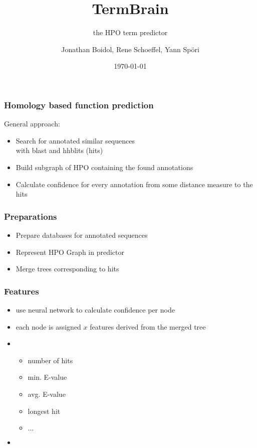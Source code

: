 \documentclass{beamer}
\author{Jonathan Boidol, Rene Schoeffel, Yann Sp\"ori}
\title{TermBrain}
\subtitle{the HPO term predictor}
\date{\today}
\begin{document}
\begin{frame}
\maketitle
 
\end{frame}

\begin{frame}
  \frametitle{Homology based function prediction}
  General approach:
  \begin{itemize}
  	\item Search for annotated similar sequences\\with blast and hhblits (hits)
  	\item Build subgraph of HPO containing the found annotations
  	\item Calculate confidence for every annotation from some distance measure to the hits
  \end{itemize}

\end{frame}

\begin{frame}
	\frametitle{Preparations}
		\begin{itemize}
			\item Prepare databases for annotated sequences
			\item Represent HPO Graph in predictor
			\item Merge trees corresponding to hits
		\end{itemize}
\end{frame}

\begin{frame}
	\frametitle{Features}
	\begin{itemize}
		\item use neural network to calculate confidence per node
		\item each node is assigned $x$ features derived from the merged tree
		\item[] \begin{itemize}
					\item number of hits
					\item min. E-value	
					\item avg. E-value \qquad[3, 0.0074, 0.45, 84, $\dots$]
					\item longest hit
					\item $\dots$ 
				\end{itemize}
				\item[] 
	\end{itemize}
\end{frame}
\end{document}
